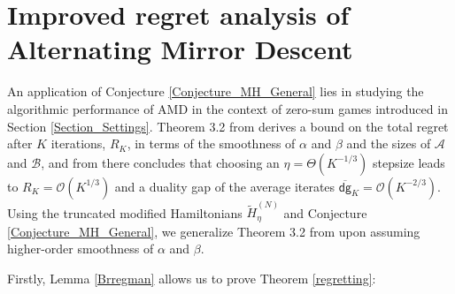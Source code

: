 \documentclass[11pt]{article}
\newcommand{\A}{\mathcal{A}}
\newcommand{\B}{\mathcal{B}}
\newcommand{\dg}{\textsf{dg}}
\begin{document}
\section{Improved regret analysis of Alternating Mirror Descent}
\label{Regret_Analysis}

An application of Conjecture \ref{Conjecture_MH_General} lies in studying the algorithmic performance of AMD in the context of zero-sum games introduced in Section \ref{Section_Settings}. Theorem 3.2 from \cite{Wibisono2022} derives a bound on the total regret after $K$ iterations, $R_{K}$, in terms of the smoothness of $\alpha$ and $\beta$ and the sizes of $\A$ and $\B$, and from there concludes that choosing an $\eta=\Theta\left(K^{-1/3}\right)$ stepsize leads to $R_{K}=\mathcal{O}\left(K^{1/3}\right)$ and a duality gap of the average iterates $\overline{\dg}_{K}=\mathcal{O}\left(K^{-2/3}\right)$. Using the truncated modified Hamiltonians $\widetilde{H}_{\eta}^{(N)}$ and Conjecture \ref{Conjecture_MH_General}, we generalize Theorem 3.2 from \cite{Wibisono2022} upon assuming higher-order smoothness of $\alpha$ and $\beta$. 

Firstly, Lemma \ref{Brregman} allows us to prove Theorem \ref{regretting}:
\end{document}
